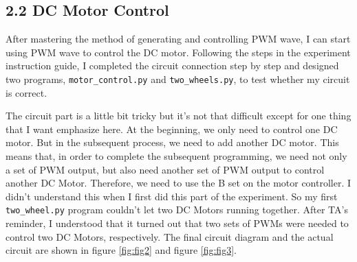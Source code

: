 \documentclass[12pt]{report}
\newcommand{\code}[1]{\colorbox{light-gray}{\texttt{#1}}}
\begin{document}
\subsection*{2.2 DC Motor Control}\vspace{-1em}
After mastering the method of generating and controlling PWM wave, I can start using PWM wave to control the DC motor. Following the steps in the experiment instruction guide, I completed the circuit connection step by step and designed two programs, \code{motor\_control.py} and \code{two\_wheels.py}, to test whether my circuit is correct.\par
The circuit part is a little bit tricky but it's not that difficult except for one thing that I want emphasize here. At the beginning, we only need to control one DC motor. But in the subsequent process, we need to add another DC motor. This means that, in order to complete the subsequent programming, we need not only a set of PWM output, but also need another set of PWM output to control another DC Motor. Therefore, we need to use the B set on the motor controller. I didn't understand this when I first did this part of the experiment. So my first \code{two\_wheel.py} program couldn't let two DC Motors running together. After TA's reminder, I understood that it turned out that two sets of PWMs were needed to control two DC Motors, respectively. The final circuit diagram and the actual circuit are shown in figure \ref{fig:fig2} and figure \ref{fig:fig3}.
\end{document}
